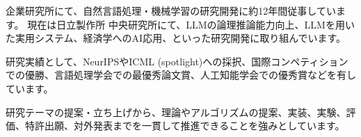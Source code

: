 企業研究所にて、自然言語処理・機械学習の研究開発に約12年間従事しています。
現在は日立製作所 中央研究所にて、LLMの論理推論能力向上、LLMを用いた実用システム、経済学へのAI応用、といった研究開発に取り組んでいます。

\vspace{2mm}
研究実績として、NeurIPSやICML (spotlight)への採択、国際コンペティションでの優勝、言語処理学会での最優秀論文賞、人工知能学会での優秀賞などを有しています。

\vspace{2mm}
研究テーマの提案・立ち上げから、理論やアルゴリズムの提案、実装、実験、評価、特許出願、対外発表までを一貫して推進できることを強みとしています。
